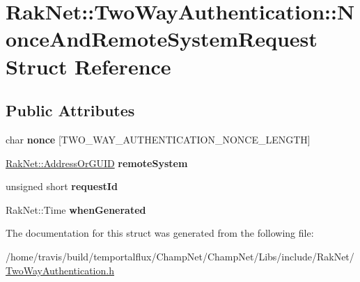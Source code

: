 \hypertarget{struct_rak_net_1_1_two_way_authentication_1_1_nonce_and_remote_system_request}{\section{Rak\-Net\-:\-:Two\-Way\-Authentication\-:\-:Nonce\-And\-Remote\-System\-Request Struct Reference}
\label{struct_rak_net_1_1_two_way_authentication_1_1_nonce_and_remote_system_request}
}
\subsection*{Public Attributes}
\begin{DoxyCompactItemize}
\item 
\hypertarget{struct_rak_net_1_1_two_way_authentication_1_1_nonce_and_remote_system_request_aaa94be663be1d057a183d72392b1de28}{char {\bfseries nonce} \mbox{[}T\-W\-O\-\_\-\-W\-A\-Y\-\_\-\-A\-U\-T\-H\-E\-N\-T\-I\-C\-A\-T\-I\-O\-N\-\_\-\-N\-O\-N\-C\-E\-\_\-\-L\-E\-N\-G\-T\-H\mbox{]}}\label{struct_rak_net_1_1_two_way_authentication_1_1_nonce_and_remote_system_request_aaa94be663be1d057a183d72392b1de28}

\item 
\hypertarget{struct_rak_net_1_1_two_way_authentication_1_1_nonce_and_remote_system_request_aae190fa101d458fdf344d1e4578d0a68}{\hyperlink{struct_rak_net_1_1_address_or_g_u_i_d}{Rak\-Net\-::\-Address\-Or\-G\-U\-I\-D} {\bfseries remote\-System}}\label{struct_rak_net_1_1_two_way_authentication_1_1_nonce_and_remote_system_request_aae190fa101d458fdf344d1e4578d0a68}

\item 
\hypertarget{struct_rak_net_1_1_two_way_authentication_1_1_nonce_and_remote_system_request_a2c50205a2e41de7b5b8d31ec76ca21fc}{unsigned short {\bfseries request\-Id}}\label{struct_rak_net_1_1_two_way_authentication_1_1_nonce_and_remote_system_request_a2c50205a2e41de7b5b8d31ec76ca21fc}

\item 
\hypertarget{struct_rak_net_1_1_two_way_authentication_1_1_nonce_and_remote_system_request_a7961796aa727f9a7bc2b1229b363461d}{Rak\-Net\-::\-Time {\bfseries when\-Generated}}\label{struct_rak_net_1_1_two_way_authentication_1_1_nonce_and_remote_system_request_a7961796aa727f9a7bc2b1229b363461d}

\end{DoxyCompactItemize}


The documentation for this struct was generated from the following file\-:\begin{DoxyCompactItemize}
\item 
/home/travis/build/temportalflux/\-Champ\-Net/\-Champ\-Net/\-Libs/include/\-Rak\-Net/\hyperlink{_two_way_authentication_8h}{Two\-Way\-Authentication.\-h}\end{DoxyCompactItemize}
